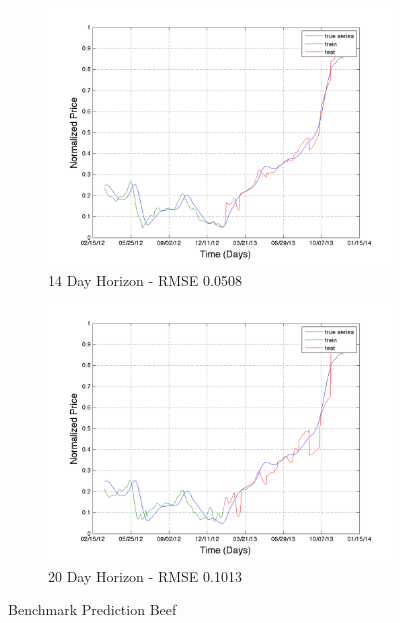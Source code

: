 \begin{figure}
       \hfill
       
        \begin{subfigure}[b]{0.5\textwidth}
                \includegraphics[width=\textwidth]{img/model/beef/pred_14}
                \caption{14 Day Horizon - RMSE 0.0508}
                \label{fig:mouse}
        \end{subfigure}%
         \begin{subfigure}[b]{0.5\textwidth}
                \includegraphics[width=\textwidth]{img/model/beef/pred_20}
                \caption{20 Day Horizon - RMSE 0.1013}
                \label{fig:mouse}
        \end{subfigure}
        \caption{Benchmark Prediction Beef}\label{fig:animals}
\end{figure}




